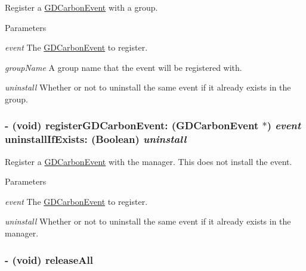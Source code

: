 Register a \hyperlink{interface_g_d_carbon_event}{GDCarbonEvent} with a group. 
\begin{DoxyParams}{Parameters}
\item[{\em event}]The \hyperlink{interface_g_d_carbon_event}{GDCarbonEvent} to register. \item[{\em groupName}]A group name that the event will be registered with. \item[{\em uninstall}]Whether or not to uninstall the same event if it already exists in the group. \end{DoxyParams}
\hypertarget{interface_g_d_carbon_event_manager_a4f55b9d19e99d98b3cbb62ed47daabfb}{
\subsubsection[{registerGDCarbonEvent:uninstallIfExists:}]{\setlength{\rightskip}{0pt plus 5cm}-\/ (void) registerGDCarbonEvent: ({\bf GDCarbonEvent} $\ast$) {\em event}\/ uninstallIfExists: (Boolean) {\em uninstall}}}
\label{interface_g_d_carbon_event_manager_a4f55b9d19e99d98b3cbb62ed47daabfb}


Register a \hyperlink{interface_g_d_carbon_event}{GDCarbonEvent} with the manager. This does not install the event.


\begin{DoxyParams}{Parameters}
\item[{\em event}]The \hyperlink{interface_g_d_carbon_event}{GDCarbonEvent} to register. \item[{\em uninstall}]Whether or not to uninstall the same event if it already exists in the manager. \end{DoxyParams}
\hypertarget{interface_g_d_carbon_event_manager_a02ef933692cbd8d55d8ddff9e1729040}{
\subsubsection[{releaseAll}]{\setlength{\rightskip}{0pt plus 5cm}-\/ (void) releaseAll }}
\label{interface_g_d_carbon_event_manager_a02ef933692cbd8d55d8ddff9e1729040}



